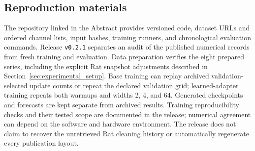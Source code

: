 \subsection{Reproduction materials}
The repository linked in the Abstract provides versioned code, dataset URLs and ordered channel lists, input hashes, training runners, and chronological evaluation commands. Release \texttt{v0.2.1} separates an audit of the published numerical records from fresh training and evaluation. Data preparation verifies the eight prepared series, including the explicit Rat snapshot adjustments described in Section~\ref{sec:experimental_setup}. Base training can replay archived validation-selected update counts or repeat the declared validation grid; learned-adapter training repeats both warmups and widths 2, 4, and 64. Generated checkpoints and forecasts are kept separate from archived results. Training reproducibility checks and their tested scope are documented in the release; numerical agreement can depend on the software and hardware environment. The release does not claim to recover the unretrieved Rat cleaning history or automatically regenerate every publication layout.
